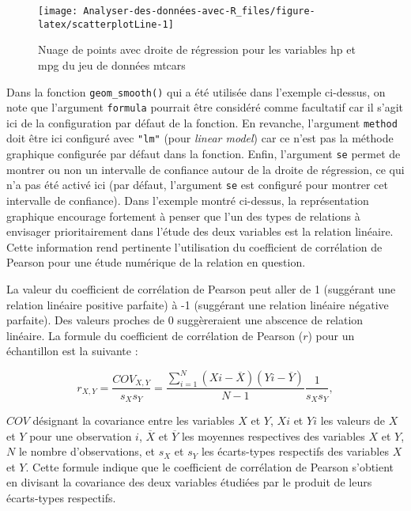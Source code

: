 \documentclass[
  french,
]{book}
\begin{document}
\begin{figure}

{\centering \texttt{[image: Analyser-des-données-avec-R\_files/figure-latex/scatterplotLine-1]} 

}

\caption{Nuage de points avec droite de régression pour les variables hp et mpg du jeu de données mtcars}\label{fig:scatterplotLine}
\end{figure}

Dans la fonction \texttt{geom\_smooth()} qui a été utilisée dans l'exemple ci-dessus, on note que l'argument \texttt{formula} pourrait être considéré comme facultatif car il s'agit ici de la configuration par défaut de la fonction. En revanche, l'argument \texttt{method} doit être ici configuré avec \texttt{"lm"} (pour \emph{linear model}) car ce n'est pas la méthode graphique configurée par défaut dans la fonction. Enfin, l'argument \texttt{se} permet de montrer ou non un intervalle de confiance autour de la droite de régression, ce qui n'a pas été activé ici (par défaut, l'argument \texttt{se} est configuré pour montrer cet intervalle de confiance). Dans l'exemple montré ci-dessus, la représentation graphique encourage fortement à penser que l'un des types de relations à envisager prioritairement dans l'étude des deux variables est la relation linéaire. Cette information rend pertinente l'utilisation du coefficient de corrélation de Pearson pour une étude numérique de la relation en question.

La valeur du coefficient de corrélation de Pearson peut aller de 1 (suggérant une relation linéaire positive parfaite) à -1 (suggérant une relation linéaire négative parfaite). Des valeurs proches de 0 suggèreraient une abscence de relation linéaire. La formule du coefficient de corrélation de Pearson (\(r\)) pour un échantillon est la suivante :

\[r_{X,Y} =  {\frac{COV_{X,Y}}{s_{X} s_{Y}}} =  {\frac{\sum_{i=1}^{N} (X{i} - \overline{X}) (Y{i} - \overline{Y})}{N-1}} {\frac{1}{s_{X} s_{Y}}},\]

\(COV\) désignant la covariance entre les variables \(X\) et \(Y\), \(X{i}\) et \(Y{i}\) les valeurs de \(X\) et \(Y\) pour une observation \(i\), \(\overline{X}\) et \(\overline{Y}\) les moyennes respectives des variables \(X\) et \(Y\), \(N\) le nombre d'observations, et \(s_{X}\) et \(s_{Y}\) les écarts-types respectifs des variables \(X\) et \(Y\). Cette formule indique que le coefficient de corrélation de Pearson s'obtient en divisant la covariance des deux variables étudiées par le produit de leurs écarts-types respectifs.
\end{document}
